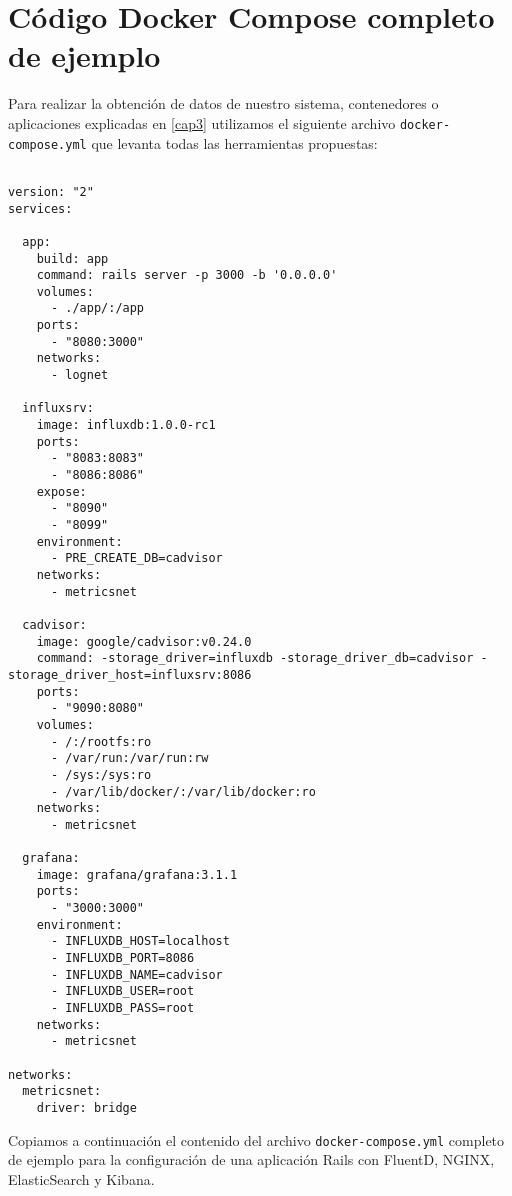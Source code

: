 \section{Código Docker Compose completo de ejemplo}
\label{anexo:C}

Para realizar la obtención de datos de nuestro sistema, contenedores o
aplicaciones explicadas en \autoref{cap3} utilizamos el siguiente archivo
\texttt{docker-compose.yml} que levanta todas las herramientas propuestas:

\begin{lstlisting}

version: "2"
services:

  app:
    build: app
    command: rails server -p 3000 -b '0.0.0.0'
    volumes:
      - ./app/:/app
    ports:
      - "8080:3000"
    networks:
      - lognet

  influxsrv:
    image: influxdb:1.0.0-rc1
    ports:
      - "8083:8083"
      - "8086:8086"
    expose:
      - "8090"
      - "8099"
    environment:
      - PRE_CREATE_DB=cadvisor
    networks:
      - metricsnet

  cadvisor:
    image: google/cadvisor:v0.24.0
    command: -storage_driver=influxdb -storage_driver_db=cadvisor -storage_driver_host=influxsrv:8086
    ports:
      - "9090:8080"
    volumes:
      - /:/rootfs:ro
      - /var/run:/var/run:rw
      - /sys:/sys:ro
      - /var/lib/docker/:/var/lib/docker:ro
    networks:
      - metricsnet

  grafana:
    image: grafana/grafana:3.1.1
    ports:
      - "3000:3000"
    environment:
      - INFLUXDB_HOST=localhost
      - INFLUXDB_PORT=8086
      - INFLUXDB_NAME=cadvisor
      - INFLUXDB_USER=root
      - INFLUXDB_PASS=root
    networks:
      - metricsnet

networks:
  metricsnet:
    driver: bridge

\end{lstlisting}

Copiamos a continuación el contenido del archivo \texttt{docker-compose.yml}
completo de ejemplo para la configuración de una aplicación Rails con FluentD,
NGINX, ElasticSearch y Kibana.

